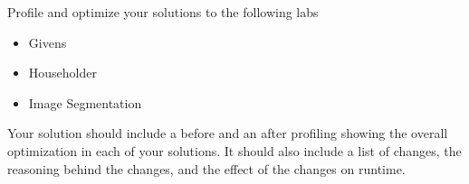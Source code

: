 \begin{problem}
Profile and optimize your solutions to the following labs
\begin{itemize}
\item Givens
\item Householder
\item Image Segmentation
\end{itemize}
Your solution should include a before and an after profiling showing the overall optimization in each of your solutions.  It should also include a list of changes, the reasoning behind the changes, and the effect of the changes on runtime.
\end{problem}
